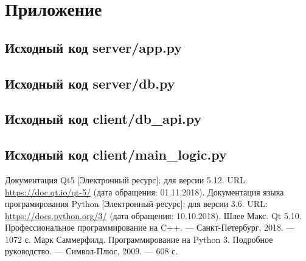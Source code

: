 \documentclass[14pt, a4paper]{extarticle}
\begin{document}
    \clearpage
    \section{Приложение}
    \subsection{Исходный код server/app.py}
    


    \clearpage
    \subsection{Исходный код server/db.py}
    




    \clearpage
    \subsection{Исходный код client/db\_api.py}
    


    \clearpage
    \subsection{Исходный код client/main\_logic.py}
    


    \clearpage
    \begin{thebibliography}{}
        \bibitem{}
        Документация Qt5 [Электронный ресурс]: для версии 5.12. URL: \url{https://doc.qt.io/qt-5/} (дата обращения: 01.11.2018).
        \bibitem{}
        Документация языка програмирования Python [Электронный ресурс]: для версии 3.6. URL: \url{https://docs.python.org/3/} (дата обращения: 10.10.2018).
        \bibitem{}
        Шлее Макс. Qt 5.10. Профессиональное программирование на C++. --- Санкт-Петербург, 2018. --- 1072 с.
        \bibitem{}
        Марк Саммерфилд. Программирование на Python 3. Подробное руководство. --- Символ-Плюс, 2009. --- 608 с.
    \end{thebibliography}
\end{document}
